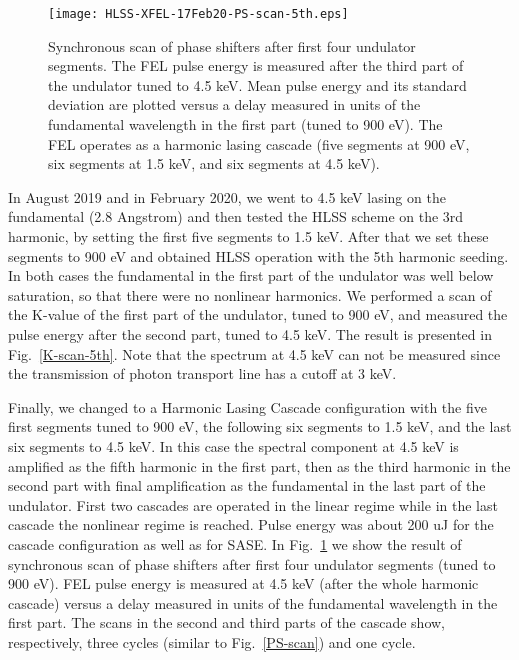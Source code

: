 \documentclass[aps,prl,preprint,groupedaddress,preprintnumbers]{revtex4}
\begin{document}
\begin{figure}[tb]

\texttt{[image: HLSS-XFEL-17Feb20-PS-scan-5th.eps]}

\caption{\small Synchronous scan of phase shifters after first four undulator segments.
The FEL pulse energy is measured after the third part of the undulator
tuned to 4.5 keV. Mean pulse energy and its standard deviation are plotted
versus a delay measured in units of the fundamental wavelength in the first part (tuned to 900 eV).
The FEL operates as a harmonic lasing cascade (five segments at 900 eV, six segments at 1.5 keV, and six segments at 4.5 keV).
}

\label{PS-scan-5th}
\end{figure}


In August 2019 and in February 2020, we went to 4.5 keV lasing on the fundamental (2.8  Angstrom) and then tested the HLSS scheme
on the 3rd harmonic, by setting the first five segments to 1.5 keV. After that we set these segments to 900 eV and
obtained HLSS operation with the 5th harmonic seeding. In both cases the fundamental in the first part of
the undulator was well below saturation, so that there were no nonlinear harmonics. 
We performed a scan of the K-value of the first part of the undulator, tuned to 900 eV, and measured the pulse energy
after the second part, tuned to 4.5 keV. The result is presented in
Fig.~\ref{K-scan-5th}. Note that the spectrum at 4.5 keV can not be measured since the transmission of photon transport line has a cutoff at 3 keV.

Finally, we changed to a Harmonic Lasing Cascade configuration with the five first segments tuned to 900 eV, the following six segments to 1.5 keV, and the last six segments to 4.5 keV. In this case the spectral component at 4.5 keV is amplified as the fifth harmonic in the first part, then as the third harmonic in the second part with final amplification as the fundamental in the last part of the undulator. First two cascades are operated in the linear regime while in the last cascade the nonlinear regime is reached. Pulse energy was about 200 uJ for the cascade configuration as well as for SASE.
In Fig.~\ref{PS-scan-5th} we show the result of synchronous scan of phase shifters after first four undulator segments (tuned to 900 eV).
FEL pulse energy is measured at 4.5 keV (after the whole harmonic cascade) 
versus a delay measured in units of the fundamental wavelength in the first part. The scans in the second and third parts of the cascade show, respectively, three cycles (similar to Fig.~\ref{PS-scan}) and one cycle.    
\end{document}
